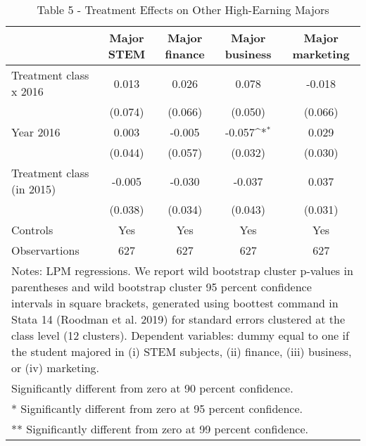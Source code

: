 \begin{table}[]
\caption{Table 5 - Treatment Effects on Other High-Earning Majors}
{
\def\sym#1{\ifmmode^{#1}\else\(^{#1}\)\fi}
\begin{tabular}{@{\extracolsep{2pt}}l*{4}{c}@{}}
\hline\hline


 & Major STEM & Major finance & Major business & Major marketing \\
\hline
Treatment class x 2016 & 0.013 & 0.026 & 0.078 & -0.018 \\
 & (0.074) & (0.066) & (0.050) & (0.066) \\
Year 2016 & 0.003 & -0.005 & -0.057\sym{*} & 0.029 \\
 & (0.044) & (0.057) & (0.032) & (0.030) \\
Treatment class (in 2015) & -0.005 & -0.030 & -0.037 & 0.037 \\
 & (0.038) & (0.034) & (0.043) & (0.031) \\
Controls & Yes & Yes & Yes & Yes \\

\hline
Observartions & 627 & 627 & 627 & 627 \\
\hline\hline
\multicolumn{5}{l}{\footnotesize Notes: LPM regressions. We report wild bootstrap cluster p-values in parentheses and wild bootstrap cluster 95 percent                confidence intervals in square brackets, generated using boottest command in Stata 14 (Roodman et al. 2019)                for standard errors clustered at the class level (12 clusters). Dependent variables: dummy equal to one if the student                majored in (i) STEM subjects, (ii) finance, (iii) business, or (iv) marketing.}\vspace{-.25em} \\
\multicolumn{5}{l}{\footnotesize * Significantly different from zero at 90 percent confidence.}\vspace{-.25em} \\
\multicolumn{5}{l}{\footnotesize ** Significantly different from zero at 95 percent confidence.}\vspace{-.25em} \\
\multicolumn{5}{l}{\footnotesize *** Significantly different from zero at 99 percent confidence.}
\end{tabular}
}
\end{table}